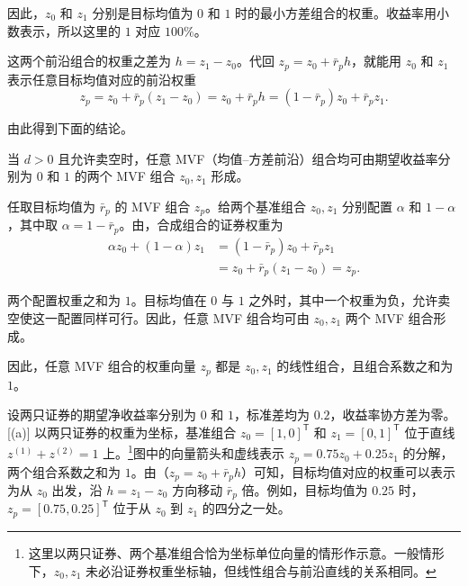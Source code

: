 因此，$z_0$ 和 $z_1$ 分别是目标均值为 $0$ 和 $1$ 时的最小方差组合的权重。收益率用小数表示，所以这里的 $1$ 对应 $100\%$。

这两个前沿组合的权重之差为 $h=z_1-z_0$。代回 $z_p=z_0+\bar r_ph$，就能用 $z_0$ 和 $z_1$ 表示任意目标均值对应的前沿权重
\begin{equation}
 z_p=z_0+\bar r_p(z_1-z_0)=z_0+\bar r_p h=(1-\bar r_p)z_0+\bar r_pz_1.
 \label{eq:wj-12-4}
\end{equation}

由此得到下面的结论。

\begin{tcolorbox}[knowledge]
 当 $d>0$ 且允许卖空时，任意 MVF（均值--方差前沿）组合均可由期望收益率分别为 $0$ 和 $1$ 的两个 MVF 组合 $z_0,z_1$ 形成。
\end{tcolorbox}

\begin{solution}[label-content={证明},blank-type=none]
任取目标均值为 $\bar r_p$ 的 MVF 组合 $z_p$。给两个基准组合 $z_0,z_1$ 分别配置 $\alpha$ 和 $1-\alpha$，其中取 $\alpha=1-\bar r_p$。由，合成组合的证券权重为
\[
 \begin{aligned}
 \alpha z_0+(1-\alpha)z_1
 &=(1-\bar r_p)z_0+\bar r_pz_1\\
 &=z_0+\bar r_p(z_1-z_0)=z_p.
 \end{aligned}
\]

两个配置权重之和为 $1$。目标均值在 $0$ 与 $1$ 之外时，其中一个权重为负，允许卖空使这一配置同样可行。因此，任意 MVF 组合均可由 $z_0,z_1$ 两个 MVF 组合形成。

因此，任意 MVF 组合的权重向量 $z_p$ 都是 $z_0,z_1$ 的线性组合，且组合系数之和为 $1$。
\end{solution}

设两只证券的期望净收益率分别为 $0$ 和 $1$，标准差均为 $0.2$，收益率协方差为零。[(a)] 以两只证券的权重为坐标，基准组合 $z_0=[1,0]^{\mathsf T}$ 和 $z_1=[0,1]^{\mathsf T}$ 位于直线 $z^{(1)}+z^{(2)}=1$ 上。\footnote{这里以两只证券、两个基准组合恰为坐标单位向量的情形作示意。一般情形下，$z_0,z_1$ 未必沿证券权重坐标轴，但线性组合与前沿直线的关系相同。}图中的向量箭头和虚线表示 $z_p=0.75z_0+0.25z_1$ 的分解，两个组合系数之和为 $1$。由（$z_p=z_0+\bar r_p h$）可知，目标均值对应的权重可以表示为从 $z_0$ 出发，沿 $h=z_1-z_0$ 方向移动 $\bar r_p$ 倍。例如，目标均值为 $0.25$ 时，$z_p=[0.75,0.25]^{\mathsf T}$ 位于从 $z_0$ 到 $z_1$ 的四分之一处。

